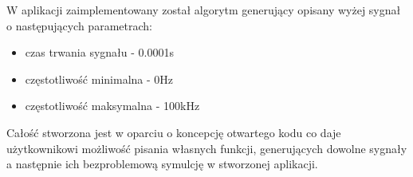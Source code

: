 W aplikacji zaimplementowany został algorytm generujący opisany wyżej sygnał o następujących parametrach:

\begin{itemize}
\item czas trwania sygnału - 0.0001s
\item częstotliwość minimalna - 0Hz
\item częstotliwość maksymalna - 100kHz
\end{itemize}

Całość stworzona jest w oparciu o koncepcję otwartego kodu co daje użytkownikowi możliwość pisania własnych funkcji, generujących dowolne sygnały a następnie ich bezproblemową symulcję w stworzonej aplikacji.
